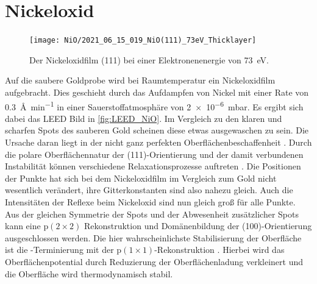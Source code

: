        
    \section{Nickeloxid}    
        \begin{figure}
            \centering
            \texttt{[image: NiO/2021\_06\_15\_019\_NiO(111)\_73eV\_Thicklayer]}
            \caption{Der Nickeloxidfilm (111) bei einer Elektronenenergie von \SI{73}{\electronvolt}.}
            \label{fig:LEED_NiO}
        \end{figure}
        Auf die saubere Goldprobe wird bei Raumtemperatur ein Nickeloxidfilm aufgebracht.
        Dies geschieht durch das Aufdampfen von Nickel mit einer Rate von \SI{0.3}{\angstrom\per\minute} in einer Sauerstoffatmosphäre von \SI{2e-6}{\milli\bar}.
        Es ergibt sich dabei das LEED Bild in \autoref{fig:LEED_NiO}.
        Im Vergleich zu den klaren und scharfen Spots des sauberen Gold scheinen diese etwas ausgewaschen zu sein.
        Die Ursache daran liegt in der nicht ganz perfekten Oberflächenbeschaffenheit \cite{NiO_34}.
        Durch die polare Oberflächennatur der (111)-Orientierung und der damit verbundenen Instabilität können verschiedene Relaxationsprozesse auftreten \cite{NiO_36, NiO_35, NiO_34, NiO_27, NiO_10}.
        Die Positionen der Punkte hat sich bei dem Nickeloxidfilm im Vergleich zum Gold nicht wesentlich verändert, ihre Gitterkonstanten sind also nahezu gleich.
        Auch die Intensitäten der Reflexe beim Nickeloxid sind nun gleich groß für alle Punkte.
        Aus der gleichen Symmetrie der Spots und der Abwesenheit zusätzlicher Spots kann eine $\text{p}(2 \times 2)$ Rekonstruktion \cite{NiO_37} und Domänenbildung der (100)-Orientierung \cite{NiO_36} ausgeschlossen werden.
        Die hier wahrscheinlichste Stabilisierung der Oberfläche ist die -Terminierung mit der $\text{p}(1 \times 1)$-Rekonstruktion \cite{NiO_35}.
        Hierbei wird das Oberflächenpotential durch Reduzierung der Oberflächenladung verkleinert und die Oberfläche wird thermodynamisch stabil.

